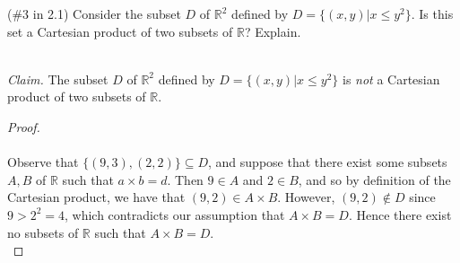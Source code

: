 (\#3 in 2.1) Consider the subset $D$ of $\mathbb{R}^2$ defined by
$D=\{(x,y)|x\leq y^2\}$. Is this set a Cartesian product of two subsets of
$\mathbb{R}$? Explain.
    
\ \\
\emph{Claim.} The subset $D$ of $\mathbb{R}^2$ defined by
$D=\{(x,y)|x\leq y^2\}$ is \emph{not} a Cartesian product of two subsets of
$\mathbb{R}$.

\begin{proof}\ \\\\
    Observe that $\{(9, 3), (2, 2)\} \subseteq D$, and suppose that there exist
    some subsets $A, B$ of $\mathbb{R}$ such that $a \times b = d$. Then 
    $9 \in A$ and $2 \in B$, and so by definition of the Cartesian product, 
    we have that $(9, 2) \in A \times B$. However, $(9, 2) \notin D$ since
    $9 > 2^2 = 4$, which contradicts our assumption that $A \times B = D$. Hence
    there exist no subsets of $\mathbb{R}$ such that $A \times B = D$. \\
\end{proof}